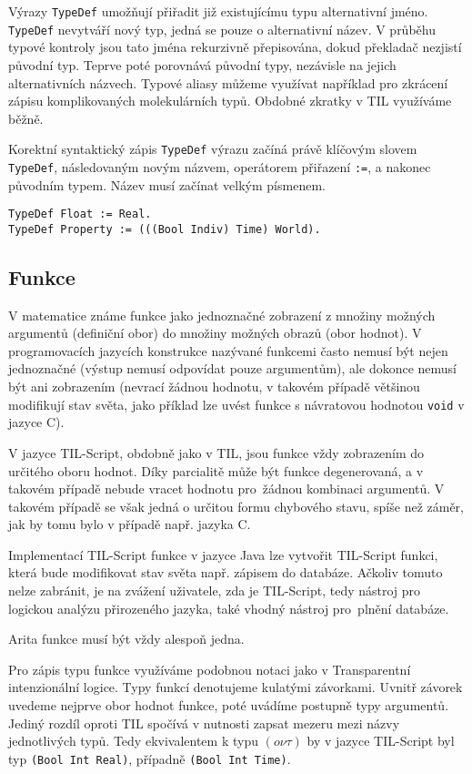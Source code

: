 Výrazy \lstinline{TypeDef} umožňují přiřadit již existujícímu typu alternativní jméno.
\lstinline{TypeDef} nevytváří nový typ, jedná se pouze o alternativní název. V průběhu typové
kontroly jsou tato jména rekurzivně přepisována, dokud překladač nezjistí původní typ. Teprve poté
porovnává původní typy, nezávisle na jejich alternativních názvech. Typové aliasy můžeme využívat
například pro zkrácení zápisu komplikovaných molekulárních typů. Obdobné zkratky v TIL využíváme
běžně.

Korektní syntaktický zápis \lstinline{TypeDef} výrazu začíná právě klíčovým slovem
\lstinline{TypeDef}, následovaným novým názvem, operátorem přiřazení \lstinline{:=}, a nakonec
původním typem. Název musí začínat velkým písmenem.

\begin{lstlisting}[caption={Výraz TypeDef}]
TypeDef Float := Real.
TypeDef Property := (((Bool Indiv) Time) World).
\end{lstlisting}

\subsection{Funkce}

V matematice známe funkce jako jednoznačné zobrazení z množiny možných argumentů (definiční obor)
do množiny možných obrazů (obor hodnot). V programovacích jazycích konstrukce nazývané funkcemi
často nemusí být nejen jednoznačné (výstup nemusí odpovídat pouze argumentům), ale dokonce nemusí
být ani zobrazením (nevrací žádnou hodnotu, v takovém případě většinou modifikují stav světa,
jako příklad lze uvést funkce s návratovou hodnotou \lstinline{void} v jazyce C).

V jazyce TIL-Script, obdobně jako v TIL, jsou funkce vždy zobrazením do určitého oboru hodnot. Díky
parcialitě může být funkce degenerovaná, a v takovém případě nebude vracet hodnotu pro~žádnou
kombinaci argumentů. V takovém případě se však jedná o určitou formu chybového stavu, spíše než
záměr, jak by tomu bylo v případě např. jazyka C.

Implementací TIL-Script funkce v jazyce Java lze vytvořit TIL-Script funkci, která bude modifikovat
stav světa např. zápisem do databáze. Ačkoliv tomuto nelze zabránit, je na zvážení uživatele, zda
je TIL-Script, tedy nástroj pro logickou analýzu přirozeného jazyka, také vhodný nástroj pro~plnění
databáze.

Arita funkce musí být vždy alespoň jedna.

Pro zápis typu funkce využíváme podobnou notaci jako v Transparentní intenzionální logice.
Typy funkcí denotujeme kulatými závorkami. Uvnitř závorek uvedeme nejprve obor hodnot funkce,
poté uvádíme postupně typy argumentů. Jediný rozdíl oproti TIL spočívá v nutnosti zapsat mezeru
mezi názvy jednotlivých typů. Tedy ekvivalentem k typu $(o\nu\tau)$ by v jazyce TIL-Script byl typ
\lstinline{(Bool Int Real)}, případně \lstinline{(Bool Int Time)}.

